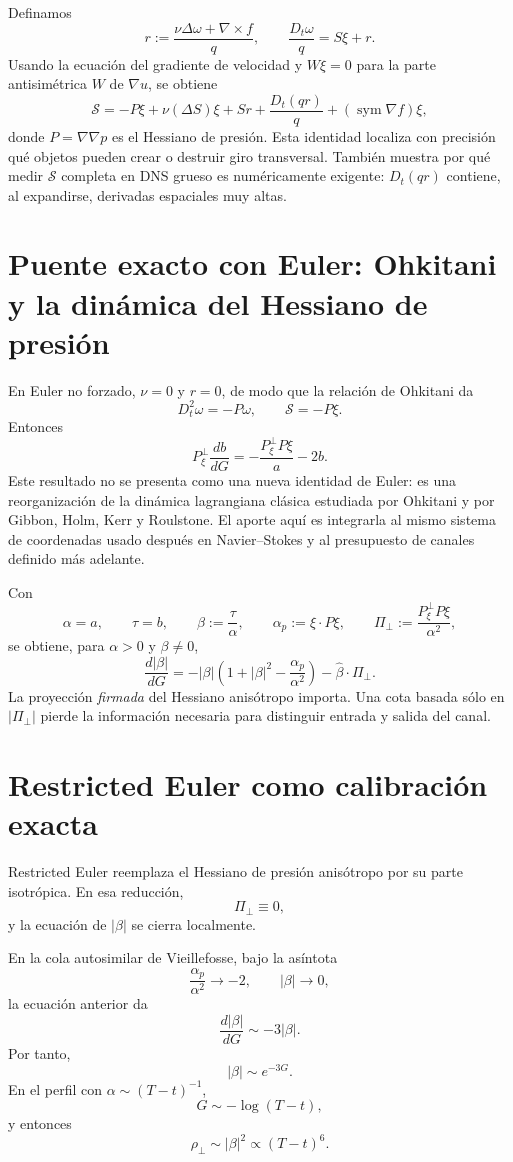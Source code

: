 \documentclass[11pt]{article}
\newcommand{\Dt}{D_t}
\newcommand{\Pperp}{P_{\xi}^{\perp}}
\newcommand{\rhoT}{\rho_{\perp}}
\newcommand{\Scal}{\mathcal S}
\begin{document}
Definamos
\[
r:=\frac{\nu\Delta\omega+\nabla\times f}{q},
\qquad
\frac{\Dt\omega}{q}=S\xi+r.
\]
Usando la ecuación del gradiente de velocidad y $W\xi=0$ para la parte antisimétrica $W$ de $\nabla u$, se obtiene
\[
\boxed{
\Scal
=-P\xi+\nu(\Delta S)\xi+Sr+
\frac{\Dt(qr)}{q}+(\operatorname{sym}\nabla f)\xi,
}
\]
donde $P=\nabla\nabla p$ es el Hessiano de presión. Esta identidad localiza con precisión qué objetos pueden crear o destruir giro transversal. También muestra por qué medir $\Scal$ completa en DNS grueso es numéricamente exigente: $\Dt(qr)$ contiene, al expandirse, derivadas espaciales muy altas.

\section{Puente exacto con Euler: Ohkitani y la dinámica del Hessiano de presión}

En Euler no forzado, $\nu=0$ y $r=0$, de modo que la relación de Ohkitani da
\[
\boxed{\Dt^2\omega=-P\omega},
\qquad
\boxed{\Scal=-P\xi}.
\]
Entonces
\[
\boxed{
\Pperp\frac{db}{dG}
=-\frac{\Pperp P\xi}{a}-2b.
}
\]
Este resultado no se presenta como una nueva identidad de Euler: es una reorganización de la dinámica lagrangiana clásica estudiada por Ohkitani y por Gibbon, Holm, Kerr y Roulstone. El aporte aquí es integrarla al mismo sistema de coordenadas usado después en Navier--Stokes y al presupuesto de canales definido más adelante.

Con
\[
\alpha=a,\qquad \tau=b,\qquad
\beta:=\frac{\tau}{\alpha},
\qquad
\alpha_p:=\xi\cdot P\xi,
\qquad
\Pi_\perp:=\frac{\Pperp P\xi}{\alpha^2},
\]
se obtiene, para $\alpha>0$ y $\beta\neq0$,
\[
\boxed{
\frac{d|\beta|}{dG}
=-|\beta|\left(1+|\beta|^2-\frac{\alpha_p}{\alpha^2}\right)
-\widehat\beta\cdot\Pi_\perp.
}
\]
La proyección \emph{firmada} del Hessiano anisótropo importa. Una cota basada sólo en $|\Pi_\perp|$ pierde la información necesaria para distinguir entrada y salida del canal.

\section{Restricted Euler como calibración exacta}

Restricted Euler reemplaza el Hessiano de presión anisótropo por su parte isotrópica. En esa reducción,
\[
\Pi_\perp\equiv0,
\]
y la ecuación de $|\beta|$ se cierra localmente.

En la cola autosimilar de Vieillefosse, bajo la asíntota
\[
\frac{\alpha_p}{\alpha^2}\to-2,
\qquad |\beta|\to0,
\]
la ecuación anterior da
\[
\frac{d|\beta|}{dG}\sim-3|\beta|.
\]
Por tanto,
\[
|\beta|\sim e^{-3G}.
\]
En el perfil con $\alpha\sim(T-t)^{-1}$,
\[
G\sim-\log(T-t),
\]
y entonces
\[
\boxed{\rhoT\sim |\beta|^2\propto(T-t)^6.}
\]
\end{document}
